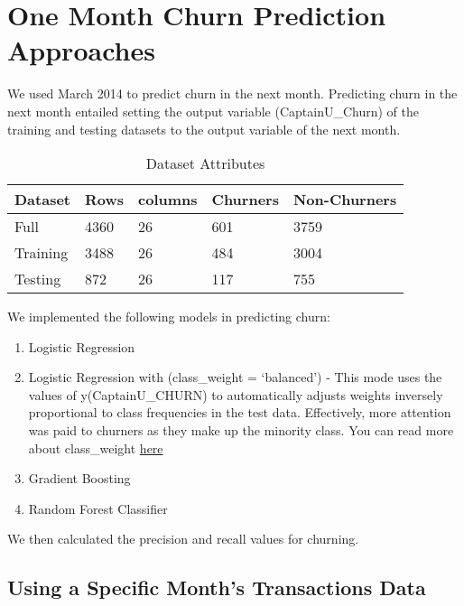 \documentclass[
10pt, %
a4paper, %
oneside, %
headinclude,footinclude, %
BCOR5mm, %
]{scrartcl}
\begin{document}
\section{One Month Churn Prediction Approaches}

We used March 2014 to predict churn in the next month. Predicting churn in the next month entailed setting the output variable (CaptainU\_Churn) of the training and testing datasets to the output variable of the next month.
\begin{table}[]
\centering
\caption{Dataset Attributes}
\label{my-label}
\begin{tabular}{@{}lllll@{}}
\toprule
Dataset  & Rows & columns & Churners & Non-Churners \\ \midrule
Full     & 4360 & 26      & 601      & 3759         \\
Training & 3488 & 26      & 484      & 3004         \\
Testing  & 872  & 26      & 117      & 755          \\ \bottomrule
\end{tabular}
\end{table}





We implemented the following models in predicting churn:
\begin{enumerate}[noitemsep] %
\item Logistic Regression 
\item Logistic Regression with (class\_weight = `balanced') - This mode uses the values of y(CaptainU\_CHURN) to automatically adjusts weights inversely proportional to class frequencies in the test data. Effectively, more attention was paid to churners as they make up the minority class.  You can read more about class\_weight \href{http://scikit-learn.org/stable/modules/generated/sklearn.linear_model.LogisticRegression.html}{here}
\item Gradient Boosting 
\item Random Forest Classifier 
\end{enumerate}

We then calculated the precision and recall values for churning. 



\subsection{Using a Specific Month's Transactions Data}
\end{document}

